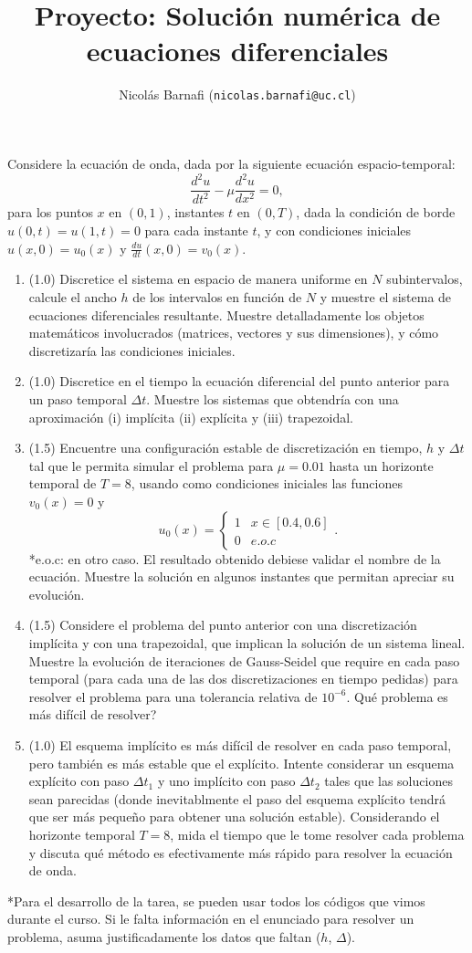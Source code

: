 \documentclass{article}
\title{Proyecto: Solución numérica de ecuaciones diferenciales}
\author{Nicolás Barnafi (\texttt{nicolas.barnafi@uc.cl})}
\date{}
\begin{document}
\maketitle


\noindent Considere la ecuación de onda, dada por la siguiente ecuación espacio-temporal: 
        $$ \frac{d^2 u}{dt^2} - \mu \frac{d^2 u}{dx^2} = 0,$$
para los puntos $x$ en $(0,1)$, instantes $t$ en $(0,T)$, dada la condición de borde $u(0, t)=u(1, t)=0$ para cada instante $t$, y con condiciones iniciales $u(x, 0) = u_0(x)$ y $\frac{d u}{dt}(x, 0) = v_0(x)$. 

    \begin{enumerate}
        \item (1.0) Discretice el sistema en espacio de manera uniforme en $N$ subintervalos, calcule el ancho $h$ de los intervalos en función de $N$ y muestre el sistema de ecuaciones diferenciales resultante. Muestre detalladamente los objetos matemáticos involucrados (matrices, vectores y sus dimensiones), y cómo discretizaría las condiciones iniciales. 
        \item (1.0) Discretice en el tiempo la ecuación diferencial del punto anterior para un paso temporal $\Delta t$. Muestre los sistemas que obtendría con una aproximación (i) implícita (ii) explícita y (iii) trapezoidal.
        \item (1.5) Encuentre una configuración estable de discretización en tiempo, $h$ y $\Delta t$ tal que le permita simular el problema para $\mu=0.01$ hasta un horizonte temporal de $T=8$, usando como condiciones iniciales las funciones $v_0(x) = 0$ y 
            $$ u_0(x) = \begin{cases} 1 & x\in [0.4, 0.6] \\   0 & e.o.c \end{cases}. $$
        *e.o.c: en otro caso. El resultado obtenido debiese validar el nombre de la ecuación. Muestre la solución en algunos instantes que permitan apreciar su evolución. 
        \item (1.5) Considere el problema del punto anterior con una discretización implícita y con una trapezoidal, que implican la solución de un sistema lineal. Muestre la evolución de iteraciones de Gauss-Seidel que require en cada paso temporal (para cada una de las dos discretizaciones en tiempo pedidas) para resolver el problema para una tolerancia relativa de $10^{-6}$. Qué problema es más difícil de resolver? 
        \item (1.0) El esquema implícito es más difícil de resolver en cada paso temporal, pero también es más estable que el explícito. Intente considerar un esquema explícito con paso $\Delta t_1$ y uno implícito con paso $\Delta t_2$ tales que las soluciones sean parecidas (donde inevitablmente el paso del esquema explícito tendrá que ser más pequeño para obtener una solución estable). Considerando el horizonte temporal $T=8$, mida el tiempo que le tome resolver cada problema y discuta qué método es efectivamente más rápido para resolver la ecuación de onda. 
    \end{enumerate}

\vspace{1cm}
*Para el desarrollo de la tarea, se pueden usar todos los códigos que vimos durante el curso. Si le falta información en el enunciado para resolver un problema, asuma justificadamente los datos que faltan ($h$, $\Delta$).
\end{document}
